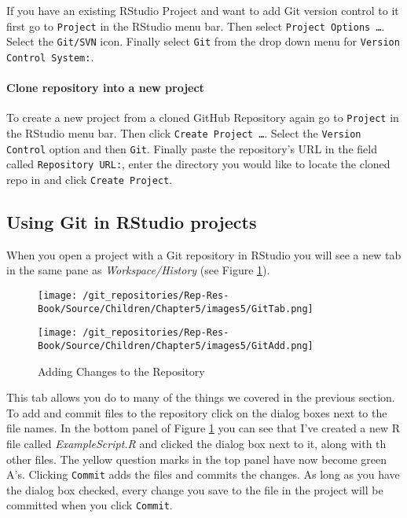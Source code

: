 If you have an existing RStudio Project and want to add Git version control to it first go to \texttt{Project} in the RStudio menu bar. Then select \texttt{Project Options \ldots}. Select the \texttt{Git/SVN} icon. Finally select \texttt{Git} from the drop down menu for \texttt{Version Control System:}.

\paragraph{Clone repository into a new project}

To create a new project from a cloned GitHub Repository again go to \texttt{Project} in the RStudio menu bar. Then click \texttt{Create Project \ldots}. Select the \texttt{Version Control} option and then \texttt{Git}. Finally paste the repository's URL in the field called \texttt{Repository URL:}, enter the directory you would like to locate the cloned repo in and click \texttt{Create Project}. 

\subsection{Using Git in RStudio projects}

When you open a project with a Git repository in RStudio you will see a new tab in the same pane as \emph{Workspace/History} (see Figure \ref{GitTab}).

\begin{figure}
    \caption{The RStudio Git Tab}
    \label{GitTab}
    \begin{center}

    \begin{subfigure}
        \caption{ExampleProject Git Tab}
            \texttt{[image: /git\_repositories/Rep-Res-Book/Source/Children/Chapter5/images5/GitTab.png]}
    \end{subfigure}
    \vspace{0.25cm}

    \begin{subfigure}
        \caption{Adding Changes to the Repository}
            \texttt{[image: /git\_repositories/Rep-Res-Book/Source/Children/Chapter5/images5/GitAdd.png]}
    \end{subfigure}
    \end{center}
\end{figure}

This tab allows you do to many of the things we covered in the previous section. To add and commit files to the repository click on the dialog boxes next to the file names. In the bottom panel of Figure \ref{GitTab} you can see that I've created a new R file called \emph{ExampleScript.R} and clicked the dialog box next to it, along with th other files. The yellow question marks in the top panel have now become green A's. Clicking \texttt{Commit} adds the files and commits the changes. As long as you have the dialog box checked, every change you save to the file in the project will be committed when you click \texttt{Commit}. 

